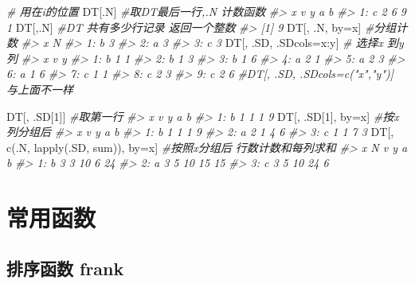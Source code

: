 \documentclass[
]{book}
\newenvironment{Shaded}{\begin{snugshade}}{\end{snugshade}}
\newcommand{\CommentTok}[1]{\textcolor[rgb]{0.56,0.35,0.01}{\textit{#1}}}
\newcommand{\DecValTok}[1]{\textcolor[rgb]{0.00,0.00,0.81}{#1}}
\newcommand{\FunctionTok}[1]{\textcolor[rgb]{0.00,0.00,0.00}{#1}}
\newcommand{\NormalTok}[1]{#1}
\newcommand{\OtherTok}[1]{\textcolor[rgb]{0.56,0.35,0.01}{#1}}
\newcommand{\SpecialCharTok}[1]{\textcolor[rgb]{0.00,0.00,0.00}{#1}}
\begin{document}
\begin{Shaded}
\begin{Highlighting}[]
\CommentTok{\# 用在i的位置}
\NormalTok{DT[.N] }\CommentTok{\#取DT最后一行,.N 计数函数}
\CommentTok{\#\textgreater{}    x v y a b}
\CommentTok{\#\textgreater{} 1: c 2 6 9 1}
\NormalTok{DT[,.N] }\CommentTok{\#DT 共有多少行记录 返回一个整数}
\CommentTok{\#\textgreater{} [1] 9}
\NormalTok{DT[, .N, by}\OtherTok{=}\NormalTok{x]  }\CommentTok{\#分组计数}
\CommentTok{\#\textgreater{}    x N}
\CommentTok{\#\textgreater{} 1: b 3}
\CommentTok{\#\textgreater{} 2: a 3}
\CommentTok{\#\textgreater{} 3: c 3}
\NormalTok{DT[, .SD, .SDcols}\OtherTok{=}\NormalTok{x}\SpecialCharTok{:}\NormalTok{y]  }\CommentTok{\# 选择x 到y 列}
\CommentTok{\#\textgreater{}    x v y}
\CommentTok{\#\textgreater{} 1: b 1 1}
\CommentTok{\#\textgreater{} 2: b 1 3}
\CommentTok{\#\textgreater{} 3: b 1 6}
\CommentTok{\#\textgreater{} 4: a 2 1}
\CommentTok{\#\textgreater{} 5: a 2 3}
\CommentTok{\#\textgreater{} 6: a 1 6}
\CommentTok{\#\textgreater{} 7: c 1 1}
\CommentTok{\#\textgreater{} 8: c 2 3}
\CommentTok{\#\textgreater{} 9: c 2 6}
\CommentTok{\#DT[, .SD, .SDcols=c("x","y")] 与上面不一样}

\NormalTok{DT[, .SD[}\DecValTok{1}\NormalTok{]] }\CommentTok{\#取第一行}
\CommentTok{\#\textgreater{}    x v y a b}
\CommentTok{\#\textgreater{} 1: b 1 1 1 9}
\NormalTok{DT[, .SD[}\DecValTok{1}\NormalTok{], by}\OtherTok{=}\NormalTok{x] }\CommentTok{\#按x列分组后}
\CommentTok{\#\textgreater{}    x v y a b}
\CommentTok{\#\textgreater{} 1: b 1 1 1 9}
\CommentTok{\#\textgreater{} 2: a 2 1 4 6}
\CommentTok{\#\textgreater{} 3: c 1 1 7 3}
\NormalTok{DT[, }\FunctionTok{c}\NormalTok{(.N, }\FunctionTok{lapply}\NormalTok{(.SD, sum)), by}\OtherTok{=}\NormalTok{x] }\CommentTok{\#按照x分组后 行数计数和每列求和}
\CommentTok{\#\textgreater{}    x N v  y  a  b}
\CommentTok{\#\textgreater{} 1: b 3 3 10  6 24}
\CommentTok{\#\textgreater{} 2: a 3 5 10 15 15}
\CommentTok{\#\textgreater{} 3: c 3 5 10 24  6}
\end{Highlighting}
\end{Shaded}

\hypertarget{ux5e38ux7528ux51fdux6570}{%
\section{常用函数}\label{ux5e38ux7528ux51fdux6570}}

\hypertarget{ux6392ux5e8fux51fdux6570-frank}{%
\subsection{排序函数 frank}\label{ux6392ux5e8fux51fdux6570-frank}}
\end{document}

